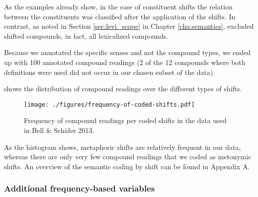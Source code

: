 As the examples already show, in the case of constituent shifts the
relation between the constituents was classified after the application
of the shifts. 
In contrast, as noted in Section \ref{sec:levi_scope}
in Chapter \ref{cha:semantics}, \citet{Levi:1978} excluded shifted
compounds, in fact, all lexicalized compounds.

Because we annotated the specific senses and not the compound types, we ended
up with 100 annotated compound readings (2 of the 12 compounds where both
definitions were used did not occur in our chosen subset of the data).

 shows the distribution of
compound readings over the different types of
shifts.

\begin{figure}[!htb]
  \centering
\texttt{[image: ./figures/frequency-of-coded-shifts.pdf]}
  
  \caption{Frequency of compound readings per coded shifts  in the
    data used in Bell \& Schäfer 2013.}
  \label{fig:frequency-of-coded-shifts}
\end{figure}

As the histogram shows, metaphoric shifts are relatively frequent in our
data, whereas there are only very few compound readings that we coded
as metonymic shifts.
An overview of the semantic coding by shift can be found in Appendix
A.%



           

\subsubsection{Additional frequency-based variables}
\label{sec:bell-schaefer-freq}

